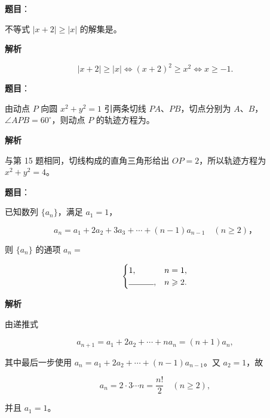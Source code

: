 \begin{answer}

\textbf{题目}：

不等式 $|x+2|\geqslant|x|$ 的解集是\gkblank{}。

\textbf{解析}

\nopagebreak[4]
\[
|x+2|\geqslant|x|
\Longleftrightarrow
(x+2)^2\geqslant x^2
\Longleftrightarrow x\geqslant-1.
\]

\gkanswer{答案：$[-1,+\infty)$}

\end{answer}
\begin{answer}

\textbf{题目}：

由动点 $P$ 向圆 $x^2+y^2=1$ 引两条切线 $PA\text{、}PB$，切点分别为 $A\text{、}B$，$\angle APB=60^\circ$，则动点 $P$ 的轨迹方程为\gkblank{}。

\textbf{解析}

与第 15 题相同，切线构成的直角三角形给出 $OP=2$，所以轨迹方程为 $x^2+y^2=4$。


\end{answer}
\begin{answer}

\textbf{题目}：

已知数列 $\{a_n\}$，满足 $a_1=1$，

\nopagebreak[4]
\[
a_n=a_1+2a_2+3a_3+\cdots+(n-1)a_{n-1}\quad(n\geqslant2)\text{，}
\]

则 $\{a_n\}$ 的通项 $a_n=$

\nopagebreak[4]
\[
\begin{cases}
1,&n=1,\\
\rule{3em}{0.4pt},&n\geqslant2.
\end{cases}
\]

\textbf{解析}

由递推式

\nopagebreak[4]
\[
a_{n+1}=a_1+2a_2+\cdots+na_n=(n+1)a_n,
\]

其中最后一步使用 $a_n=a_1+2a_2+\cdots+(n-1)a_{n-1}$。又 $a_2=1$，故

\nopagebreak[4]
\[
a_n=2\cdot3\cdots n=\frac{n!}{2}\quad(n\geqslant2),
\]

并且 $a_1=1$。


\end{answer}
